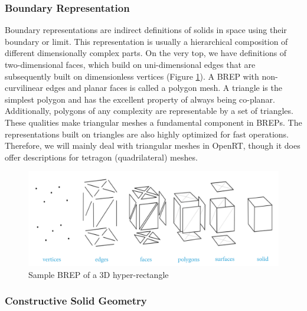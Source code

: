 \documentclass[a4paper,11pt,oneside]{article}
\begin{document}
\subsubsection{Boundary Representation}
    
Boundary representations are indirect definitions of solids in space using their boundary or limit. This representation is usually a hierarchical composition of different dimensionally complex parts. On the very top, we have definitions of two-dimensional faces, which build on uni-dimensional edges that are subsequently built on dimensionless vertices (Figure \ref{fig2:brep_3d_rect}). A BREP with non-curvilinear edges and planar faces is called a polygon mesh. A triangle is the simplest polygon and has the excellent property of always being co-planar. Additionally, polygons of any complexity are representable by a set of triangles. These qualities make triangular meshes a fundamental component in BREPs. The representations built on triangles are also highly optimized for fast operations. Therefore, we will mainly deal with triangular meshes in OpenRT, though it does offer descriptions for tetragon (quadrilateral) meshes.
    
    
\begin{figure}[ht]
	\begin{center}
		\includegraphics[width=.8\textwidth]{section1/brep-overview.png}
	\end{center}
	\caption{Sample BREP of a 3D hyper-rectangle \cite{wikipedia_2021_mesh_rep}}
	\label{fig2:brep_3d_rect}
\end{figure}
    
\subsubsection{Constructive Solid Geometry}
\end{document}
